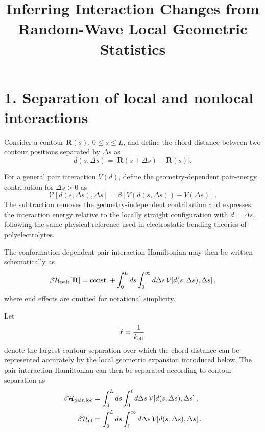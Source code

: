 \documentclass[11pt]{article}
\title{Inferring Interaction Changes from Random-Wave Local Geometric Statistics}
\begin{document}
\maketitle

\section*{1. Separation of local and nonlocal interactions}

Consider a contour \(\mathbf R(s)\), \(0\leq s\leq L\), and define the chord distance between two contour positions separated by \(\Delta s\) as
\begin{equation}
d(s,\Delta s)
=
\left|
\mathbf R(s+\Delta s)-\mathbf R(s)
\right|.
\end{equation}

For a general pair interaction \(V(d)\), define the geometry-dependent pair-energy contribution for \(\Delta s>0\) as
\begin{equation}
\mathcal V\!\left[d(s,\Delta s),\Delta s\right]
=
\beta\left[
V\!\left(d(s,\Delta s)\right)
-
V(\Delta s)
\right].
\end{equation}
The subtraction removes the geometry-independent contribution and expresses the interaction energy relative to the locally straight configuration with \(d=\Delta s\), following the same physical reference used in electrostatic bending theories of polyelectrolytes.

The conformation-dependent pair-interaction Hamiltonian may then be written schematically as
\begin{equation}
\beta\mathcal H_{\rm pair}[\mathbf R]
=
\mathrm{const.}
+
\int_0^L ds
\int_0^\infty d\Delta s\,
\mathcal V\!\left[d(s,\Delta s),\Delta s\right],
\end{equation}
where end effects are omitted for notational simplicity.

Let
\begin{equation}
\ell=\frac{1}{k_{\rm eff}}
\end{equation}
denote the largest contour separation over which the chord distance can be represented accurately by the local geometric expansion introduced below. The pair-interaction Hamiltonian can then be separated according to contour separation as
\begin{align}
\beta\mathcal H_{\rm pair,loc}
&=
\int_0^L ds
\int_0^\ell d\Delta s\,
\mathcal V\!\left[d(s,\Delta s),\Delta s\right],
\nonumber\\
\beta\mathcal H_{\rm nl}
&=
\int_0^L ds
\int_\ell^\infty d\Delta s\,
\mathcal V\!\left[d(s,\Delta s),\Delta s\right].
\end{align}
\end{document}
